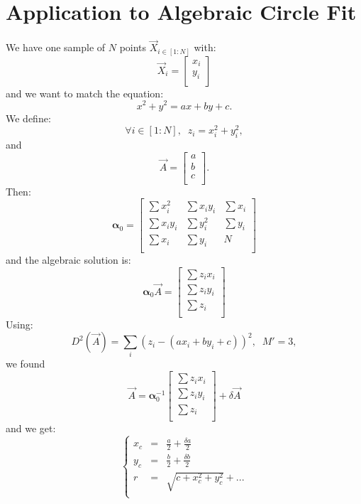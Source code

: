 \documentclass[aps,12pt]{revtex4}
\begin{document}
\section{Application to Algebraic Circle Fit}
We have one sample of $N$ points $\vec{X}_{i\in[1:N]}$ with:
\begin{equation}
	\vec{X}_i = \begin{bmatrix}x_i\\y_i\\\end{bmatrix}
\end{equation}
and we want to match the equation:
\begin{equation}
	x^2+y^2=ax+by+c.
\end{equation}
We define:
\begin{equation}
	\forall i \in [1:N], \;\; z_i = x_i^2+y_i^2,
\end{equation}
and
\begin{equation}
	\vec{A} = \begin{bmatrix} a\\b\\c\\ \end{bmatrix}.
\end{equation}
Then:
\begin{equation}
	\bm{\alpha}_0 = 
	\begin{bmatrix}
	\sum x_i^2 & \sum x_iy_i & \sum x_i\\
	\sum x_iy_i & \sum y_i^2 & \sum y_i\\
	\sum x_i & \sum y_i & N \\
	\end{bmatrix}
\end{equation}
and the algebraic solution is:
\begin{equation}
\bm{\alpha}_0 \vec{A} = \begin{bmatrix}
	\sum z_i x_i\\
	\sum z_i y_i\\
	\sum z_i\\
\end{bmatrix}
\end{equation}
Using:
\begin{equation}
	D^2(\vec{A}) = \sum_i \left(z_i - (ax_i+by_i+c)\right)^2, \;\; M'=3,
\end{equation}
we found
\begin{equation}
	\vec{A} = \bm{\alpha}_0^{-1} \begin{bmatrix}
	\sum z_i x_i\\
	\sum z_i y_i\\
	\sum z_i\\
\end{bmatrix}
+ \delta \vec{A}
\end{equation}
and we get:
\begin{equation}
\left\lbrace
\begin{array}{rcl}
	x_c & = & \frac{a}{2} + \frac{\delta a}{2}\\
	y_c & = & \frac{b}{2} + \frac{\delta b}{2}\\
	r   & = & \sqrt{c+x_c^2+y_c^2} + ...\\
\end{array}
\right.
\end{equation}
\end{document}
